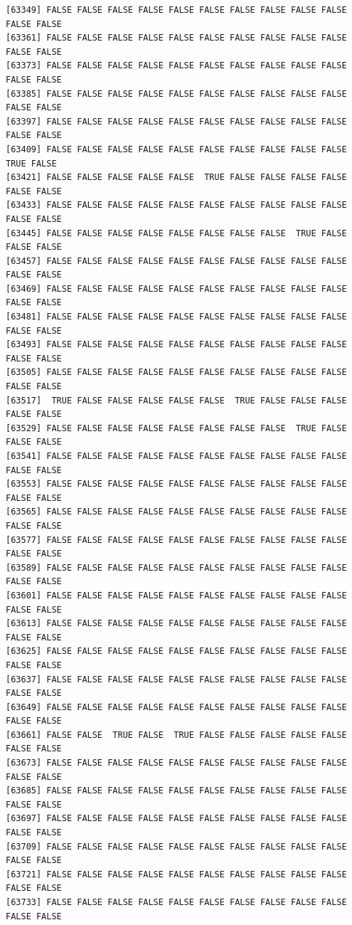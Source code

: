 \documentclass[
  a4paper,
  DIV=11,
  numbers=noendperiod]{scrartcl}
\begin{document}
\begin{verbatim}
[63349] FALSE FALSE FALSE FALSE FALSE FALSE FALSE FALSE FALSE FALSE FALSE FALSE
[63361] FALSE FALSE FALSE FALSE FALSE FALSE FALSE FALSE FALSE FALSE FALSE FALSE
[63373] FALSE FALSE FALSE FALSE FALSE FALSE FALSE FALSE FALSE FALSE FALSE FALSE
[63385] FALSE FALSE FALSE FALSE FALSE FALSE FALSE FALSE FALSE FALSE FALSE FALSE
[63397] FALSE FALSE FALSE FALSE FALSE FALSE FALSE FALSE FALSE FALSE FALSE FALSE
[63409] FALSE FALSE FALSE FALSE FALSE FALSE FALSE FALSE FALSE FALSE  TRUE FALSE
[63421] FALSE FALSE FALSE FALSE FALSE  TRUE FALSE FALSE FALSE FALSE FALSE FALSE
[63433] FALSE FALSE FALSE FALSE FALSE FALSE FALSE FALSE FALSE FALSE FALSE FALSE
[63445] FALSE FALSE FALSE FALSE FALSE FALSE FALSE FALSE  TRUE FALSE FALSE FALSE
[63457] FALSE FALSE FALSE FALSE FALSE FALSE FALSE FALSE FALSE FALSE FALSE FALSE
[63469] FALSE FALSE FALSE FALSE FALSE FALSE FALSE FALSE FALSE FALSE FALSE FALSE
[63481] FALSE FALSE FALSE FALSE FALSE FALSE FALSE FALSE FALSE FALSE FALSE FALSE
[63493] FALSE FALSE FALSE FALSE FALSE FALSE FALSE FALSE FALSE FALSE FALSE FALSE
[63505] FALSE FALSE FALSE FALSE FALSE FALSE FALSE FALSE FALSE FALSE FALSE FALSE
[63517]  TRUE FALSE FALSE FALSE FALSE FALSE  TRUE FALSE FALSE FALSE FALSE FALSE
[63529] FALSE FALSE FALSE FALSE FALSE FALSE FALSE FALSE  TRUE FALSE FALSE FALSE
[63541] FALSE FALSE FALSE FALSE FALSE FALSE FALSE FALSE FALSE FALSE FALSE FALSE
[63553] FALSE FALSE FALSE FALSE FALSE FALSE FALSE FALSE FALSE FALSE FALSE FALSE
[63565] FALSE FALSE FALSE FALSE FALSE FALSE FALSE FALSE FALSE FALSE FALSE FALSE
[63577] FALSE FALSE FALSE FALSE FALSE FALSE FALSE FALSE FALSE FALSE FALSE FALSE
[63589] FALSE FALSE FALSE FALSE FALSE FALSE FALSE FALSE FALSE FALSE FALSE FALSE
[63601] FALSE FALSE FALSE FALSE FALSE FALSE FALSE FALSE FALSE FALSE FALSE FALSE
[63613] FALSE FALSE FALSE FALSE FALSE FALSE FALSE FALSE FALSE FALSE FALSE FALSE
[63625] FALSE FALSE FALSE FALSE FALSE FALSE FALSE FALSE FALSE FALSE FALSE FALSE
[63637] FALSE FALSE FALSE FALSE FALSE FALSE FALSE FALSE FALSE FALSE FALSE FALSE
[63649] FALSE FALSE FALSE FALSE FALSE FALSE FALSE FALSE FALSE FALSE FALSE FALSE
[63661] FALSE FALSE  TRUE FALSE  TRUE FALSE FALSE FALSE FALSE FALSE FALSE FALSE
[63673] FALSE FALSE FALSE FALSE FALSE FALSE FALSE FALSE FALSE FALSE FALSE FALSE
[63685] FALSE FALSE FALSE FALSE FALSE FALSE FALSE FALSE FALSE FALSE FALSE FALSE
[63697] FALSE FALSE FALSE FALSE FALSE FALSE FALSE FALSE FALSE FALSE FALSE FALSE
[63709] FALSE FALSE FALSE FALSE FALSE FALSE FALSE FALSE FALSE FALSE FALSE FALSE
[63721] FALSE FALSE FALSE FALSE FALSE FALSE FALSE FALSE FALSE FALSE FALSE FALSE
[63733] FALSE FALSE FALSE FALSE FALSE FALSE FALSE FALSE FALSE FALSE FALSE FALSE

\end{verbatim}
\end{document}
